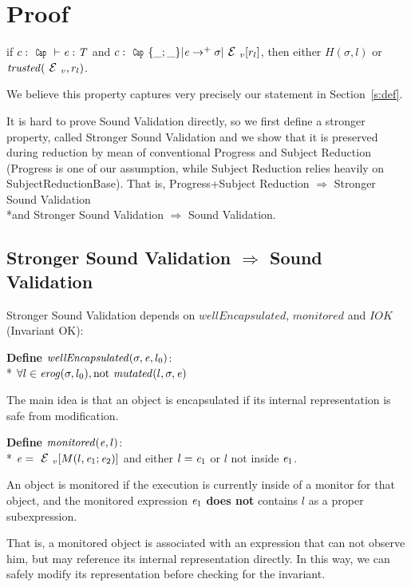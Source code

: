 \appendix
\section{Proof} 
\label{s:proof}

\begin{Theorem}
if $c:\Kw{Cap}\vdash \e: \T$ and
$c:\Kw{Cap}\{\_;\_\}|\e\rightarrow^+ \sigma|\ctx_v[r_l]$, then
either $H(\sigma,l)$ or $\mathit{trusted}(\ctx_v,r_l)$.
\end{Theorem}

We believe this property captures very precisely our statement in Section~\ref{s:def}.

It is hard to prove Sound Validation directly,
so we first define a stronger property,
called Stronger Sound Validation and
we show that it is preserved during reduction by mean of conventional 
Progress and Subject Reduction (Progress is one of our assumption,
while Subject Reduction relies heavily on SubjectReductionBase).
That is,
Progress+Subject Reduction $\Rightarrow$ Stronger Sound Validation
\\*and Stronger Sound Validation $\Rightarrow$ Sound Validation.

\subsection{Stronger Sound Validation $\Rightarrow$ Sound Validation}

Stronger Sound Validation depends on 
$\mathit{wellEncapsulated}$, $\mathit{monitored}$
and $IOK$ (Invariant OK):

\noindent\textbf{Define} $\mathit{wellEncapsulated}(\sigma,\e,l_0)$:\\*
${}_{}$\quad\quad$\forall l \in \mathit{erog}(\sigma,l_0), \text{not}\ \mathit{mutated}(l,\sigma,\e)$

\noindent The main idea is that an object is encapsulated if its internal representation is safe from
modification. 

\noindent\textbf{Define} $\mathit{monitored}({\mathit{e}},l)$:\\*
${}_{}$\quad\quad  $\e=\ctx_v[M(l,\e_1;\e_2)]$ and either $l={\mathit{e}}_1$ or $l$ not inside ${\mathit{e}}_1$.

\noindent An object is monitored if the execution
is currently inside of a monitor for that object, and
the monitored expression ${\mathit{e}}_1$ \textbf{does not}
contains $l$ as a proper subexpression.

That is, a monitored object is associated with an expression that can not observe him, but may 
reference its internal representation directly.
In this way, we can safely modify its representation before checking for the invariant.

